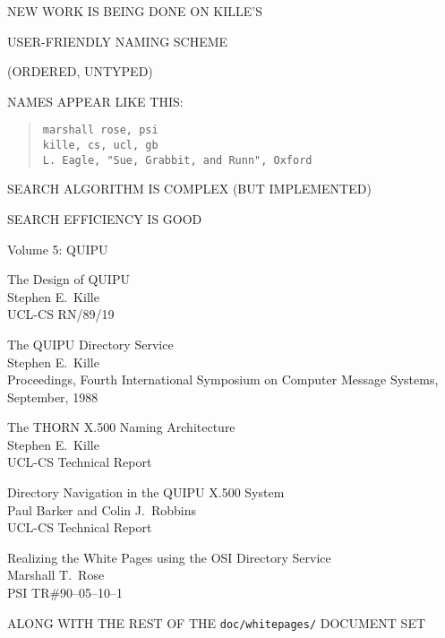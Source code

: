 \begin{bwslide}

\begin{nrtc}
\item	NEW WORK IS BEING DONE ON KILLE'S
    \begin{nrtc}
    \item	USER-FRIENDLY NAMING SCHEME
    \end{nrtc}
    (ORDERED, UNTYPED)

\item	NAMES APPEAR LIKE THIS:
\begin{quote}\small\begin{verbatim}
marshall rose, psi
kille, cs, ucl, gb
L. Eagle, "Sue, Grabbit, and Runn", Oxford
\end{verbatim}\end{quote}

\item	SEARCH ALGORITHM IS COMPLEX (BUT IMPLEMENTED)
    \begin{nrtc}
    \item	SEARCH EFFICIENCY IS GOOD
    \end{nrtc}
\end{nrtc}
\end{bwslide}


\begin{bwslide}

\begin{nrtc}
\item	Volume 5: QUIPU

\item	The Design of QUIPU\\
	Stephen E.~Kille\\
	UCL-CS RN/89/19

\item	The QUIPU Directory Service\\
	Stephen E.~Kille\\
        Proceedings, Fourth International Symposium on Computer Message
	Systems, September, 1988

\item	The THORN X.500 Naming Architecture\\
	Stephen E.~Kille\\
	UCL-CS Technical Report

\item	Directory Navigation in the QUIPU X.500 System\\
	Paul Barker and Colin J.~Robbins\\
	UCL-CS Technical Report

\item	Realizing the White Pages using the OSI Directory Service\\
	Marshall T.~Rose\\
	PSI TR\#90--05--10--1

\item	ALONG WITH THE REST OF THE \verb"doc/whitepages/" DOCUMENT SET
\end{nrtc}
\end{bwslide}
